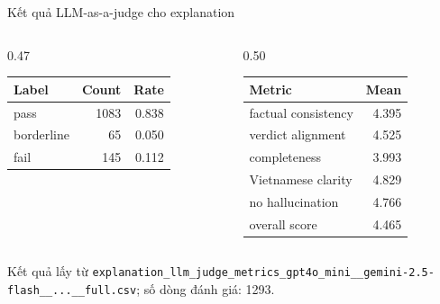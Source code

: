 \documentclass[aspectratio=169]{beamer}
\begin{document}
\begin{frame}{Kết quả LLM-as-a-judge cho explanation}
  \begin{columns}[T,onlytextwidth]
    \begin{column}{0.47\textwidth}
      \begin{table}
        \centering
        \small
        \begin{tabular}{lrr}
          \toprule
          Label & Count & Rate \\
          \midrule
          pass & 1083 & 0.838 \\
          borderline & 65 & 0.050 \\
          fail & 145 & 0.112 \\
          \bottomrule
        \end{tabular}
      \end{table}
    \end{column}
    \begin{column}{0.50\textwidth}
      \begin{table}
        \centering
        \small
        \begin{tabular}{lr}
          \toprule
          Metric & Mean \\
          \midrule
          factual consistency & 4.395 \\
          verdict alignment & 4.525 \\
          completeness & 3.993 \\
          Vietnamese clarity & 4.829 \\
          no hallucination & 4.766 \\
          overall score & 4.465 \\
          \bottomrule
        \end{tabular}
      \end{table}
    \end{column}
  \end{columns}

  \vspace{0.1cm}
  \footnotesize
  Kết quả lấy từ \texttt{explanation\_llm\_judge\_metrics\_gpt4o\_mini\_\_gemini-2.5-flash\_\_...\_\_full.csv}; số dòng đánh giá: 1293.
\end{frame}
\end{document}
